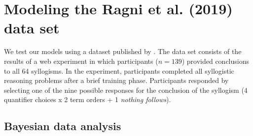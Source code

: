 \documentclass[floatsintext, doc]{apa6}
\begin{document}


\section{Modeling the Ragni et al. (2019) data set}

We test our models using a dataset published by . 
The data set consists of the results of a web experiment in which participants ($n = 139$) provided conclusions to all 64 syllogisms. In the experiment, participants completed all syllogistic reasoning problems after a brief training phase. Participants responded by selecting one of the nine possible responses for the conclusion of the syllogism (4 quantifier choices x 2 term orders + 1 \emph{nothing follows}).


%


\subsection{Bayesian data analysis}
\end{document}
